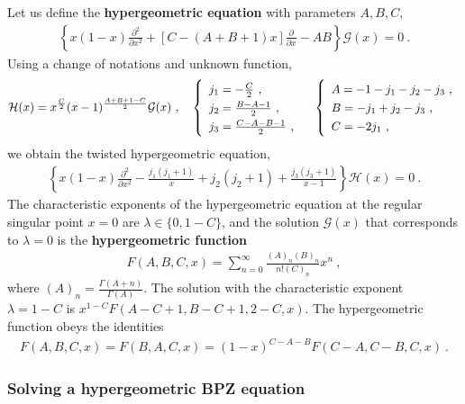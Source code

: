 \documentclass[12pt, a4paper, notitlepage, twoside]{report}
\numberwithin{equation}{section}
\theoremstyle{break}
\begin{document}
 Let us define the \textbf{\boldmath hypergeometric equation} with parameters $A,B,C$, 
\begin{align}
 \left\{ x(1-x) \frac{\partial^2}{\partial x^2} +\left[C-(A+B+1)x\right]{\frac{\partial}{\partial x}} - AB \right\} \mathcal{G}(x)= 0\ .
\label{dzp}
\end{align}
Using a change of notations and unknown function,
\begin{align}
 \mathcal{H}(x)= x^{\frac{C}{2}} (x-1)^{\frac{A+B+1-C}{2}}\mathcal{G}(x)\ , \quad \renewcommand{\arraystretch}{1.3}\left\{\begin{array}{l}  j_1 = -\frac{C}{2} \ , \\ j_2=\frac{B-A-1}{2} \ , \\  j_3= \frac{C-A-B-1}{2}\ , \end{array}\right.    
\quad \left\{\begin{array}{l}  A = -1-j_1-j_2-j_3\ , \\ B = -j_1+j_2-j_3\ , \\ C = -2j_1\ , \end{array}\right. 
\end{align}
we obtain the twisted hypergeometric equation,
\begin{align}
 \left\{ x(1-x) \frac{\partial^2}{\partial x^2}  -\frac{j_1(j_1+1)}{x}+ j_2(j_2+1)+\frac{j_3(j_3+1)}{x-1}\right\} \mathcal{H}(x) = 0\ .
\label{hj}
\end{align}
The characteristic exponents of the hypergeometric equation at the regular singular point $x=0$ are $\lambda\in \{0,1-C\}$, and the solution $\mathcal{G}(x)$ that corresponds to $\lambda=0$
 is the \textbf{\boldmath hypergeometric function}
\begin{align}
 F(A,B,C,x) = \sum_{n=0}^\infty \frac{(A)_n(B)_n}{n!(C)_n}x^n\ ,
\label{fsn}
\end{align}
where $(A)_n = \frac{\Gamma(A+n)}{\Gamma(A)}$.
The solution with the characteristic exponent $\lambda=1-C$ is $x^{1-C}F(A-C+1,B-C+1,2-C,x)$.
The hypergeometric function obeys the identities 
\begin{align}
 F(A,B,C,x) = F(B,A,C,x) = (1-x)^{C-A-B} F(C-A,C-B,C,x)\ .
\label{fff}
\end{align}

\subsubsection{Solving a hypergeometric BPZ equation}
\end{document}
